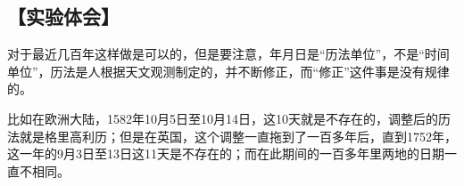 \subsection*{【实验体会】}
对于最近几百年这样做是可以的，但是要注意，年月日是“历法单位”，不是“时间单位”，历法是人根据天文观测制定的，并不断修正，而“修正”这件事是没有规律的。

比如在欧洲大陆，1582年10月5日至10月14日，这10天就是不存在的，调整后的历法就是格里高利历；但是在英国，这个调整一直拖到了一百多年后，直到1752年，这一年的9月3日至13日这11天是不存在的；而在此期间的一百多年里两地的日期一直不相同。
